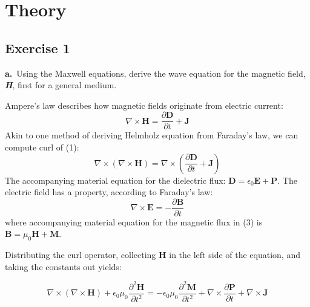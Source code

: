 \documentclass[11pt,a4paper]{article}
\begin{document}
 

\section{Theory}
\subsection*{Exercise 1}
\begin{displayquote}
\textbf{a.}~Using the Maxwell equations, derive the wave equation for the magnetic field, \textbf{\textit{H}}, first for a general medium.
\end{displayquote}

Ampere's law describes how magnetic fields originate from electric current:
\begin{equation}
\nabla\times\textbf{H}=\frac{\partial\textbf{D}}{\partial{}t}+\textbf{J}
\end{equation}
Akin to one method of deriving Helmholz equation from Faraday's law, we can compute curl of (1):
\begin{equation}
\nabla\times(\nabla\times\textbf{H})=\nabla\times(\frac{\partial\textbf{D}}{\partial{}t}+\textbf{J})
\end{equation}
The accompanying material equation for the dielectric flux: $\textbf{D}=\epsilon_0\textbf{E}+\textbf{P}$. The electric field has a property, according to Faraday's law:
\begin{equation*}
    \nabla\times\textbf{E}=-\frac{\partial\textbf{B}}{\partial{t}}
\end{equation*}
where accompanying material equation for the magnetic flux in (3) is $\textbf{B}=\mu_0\textbf{H}+\textbf{M}$. 

Distributing the curl operator, collecting \textbf{H} in the left side of the equation, and taking the constants out yields:

\begin{equation}
 \nabla\times(\nabla\times\textbf{H})+\epsilon_0\mu_0\frac{\partial^2\textbf{H}}{\partial{t^2}}=-\epsilon_0\mu_0\frac{\partial^2\textbf{M}}{\partial{t^2}}+\nabla\times\frac{\partial\textbf{P}}{\partial{t}}+\nabla\times\textbf{J}
  \end{equation}
\end{document}

